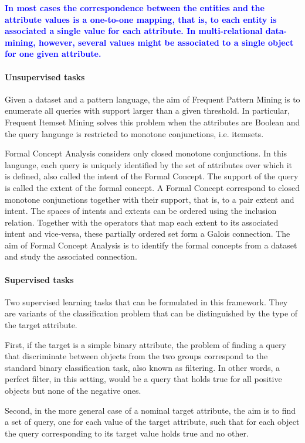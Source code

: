 \documentclass[a4paper,10pt]{article}
\newcommand{\note}[1]{\textcolor{blue}{\textbf{#1}}}
\begin{document}
\note{In most cases the correspondence between the entities and the
attribute values is a one-to-one mapping, that is, to each entity is
associated a single value for each attribute. In multi-relational
data-mining, however, several values might be associated to a single
object for one given attribute.}


\paragraph{Unsupervised tasks}
Given a dataset and a pattern language, the aim of Frequent Pattern
Mining is to enumerate all queries with support larger than a given
threshold.  In particular, Frequent Itemset Mining solves this problem
when the attributes are Boolean and the query language is restricted
to monotone conjunctions, i.e. itemsets.

Formal Concept Analysis considers only closed monotone
conjunctions. In this language, each query is uniquely identified by
the set of attributes over which it is defined, also called the intent
of the Formal Concept. The support of the query is called the extent
of the formal concept.  A Formal Concept correspond to closed monotone
conjunctions together with their support, that is, to a pair extent
and intent.  The spaces of intents and extents can be ordered using
the inclusion relation. Together with the operators that map each
extent to its associated intent and vice-versa, these partially
ordered set form a Galois connection.  The aim of Formal Concept
Analysis is to identify the formal concepts from a dataset and study
the associated connection.

\paragraph{Supervised tasks}

Two supervised learning tasks that can be formulated in this
framework.  They are variants of the classification problem that can
be distinguished by the type of the target attribute.  

First, if the target is a simple binary attribute, the problem of
finding a query that discriminate between objects from the two groups
correspond to the standard binary classification task, also known as
filtering. In other words, a perfect filter, in this setting, would be
a query that holds true for all positive objects but none of the
negative ones.

Second, in the more general case of a nominal target attribute, the
aim is to find a set of query, one for each value of the target
attribute, such that for each object the query corresponding to its
target value holds true and no other.
\end{document}
